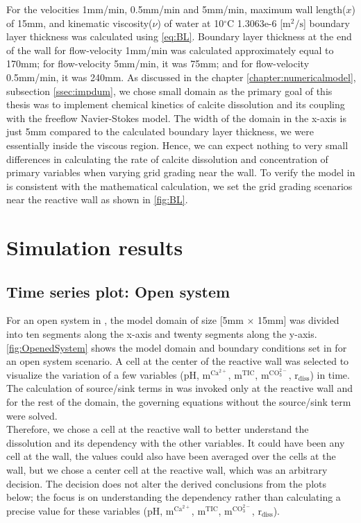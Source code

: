 For the velocities 1mm/min, 0.5mm/min and 5mm/min, maximum wall length($x$) of 15mm, and kinematic viscosity($\nu$) of 
water at 10$^\circ$C 1.3063e-6 [$\mathrm{m^2/s}$] \cite{wagner2008iapws} boundary layer thickness was calculated using \cref{eq:BL}. 
Boundary layer thickness at the end of the wall for flow-velocity 1mm/min was calculated approximately equal to 170mm; 
for flow-velocity 5mm/min, it was 75mm; and for flow-velocity 0.5mm/min, it was 240mm. As discussed in the chapter 
\ref{chapter:numericalmodel}, subsection \ref{ssec:impdum}, we chose small domain as the primary goal of this thesis was to 
implement chemical kinetics of calcite dissolution and its coupling with the freeflow Navier-Stokes model. 
The width of the domain in the x-axis is just 5mm compared to the calculated boundary layer thickness, we were essentially 
inside the viscous region. Hence, we can expect nothing to very small differences in calculating the rate of calcite dissolution and concentration 
of primary variables when varying grid grading near the wall. To verify the model in \DuMuX is 
consistent with the mathematical calculation, we set the grid grading scenarios near the reactive wall as shown in \cref{fig:BL}. \\

\section{\DuMuX Simulation results}

\subsection{Time series plot: Open system}\label{ssec:timeSeriesOpen}
For an open system in \DuMuX, the model domain of size [5mm $\times$ 15mm] was divided into ten segments along the x-axis and twenty segments along the y-axis. 
\cref{fig:OpenedSystem} shows the model domain and boundary conditions set in \DuMuX for an open system scenario. 
A cell at the center of the reactive wall was selected to visualize the variation of a few variables (pH, $\mathrm{m^{Ca^{2+}}}$, $\mathrm{m^{TIC}}$, 
$\mathrm{m^{CO_3^{2-}}}$, $\mathrm{r_{diss}}$) in time.  
The calculation of source/sink terms in \DuMuX was invoked only at the reactive wall and for the rest of 
the domain, the governing equations without the source/sink term were solved. \\
Therefore, we chose a cell at the reactive wall to better understand the dissolution
and its dependency with the other variables. It could have been any cell at the wall, the values could also have been averaged over the cells at the wall, but we 
chose a center cell at the reactive wall, which was an arbitrary decision. The decision does not alter the derived conclusions from the plots below; the focus is on 
understanding the dependency rather than calculating a precise value for these variables (pH, $\mathrm{m^{Ca^{2+}}}$, $\mathrm{m^{TIC}}$, 
$\mathrm{m^{CO_3^{2-}}}$, $\mathrm{r_{diss}}$).

